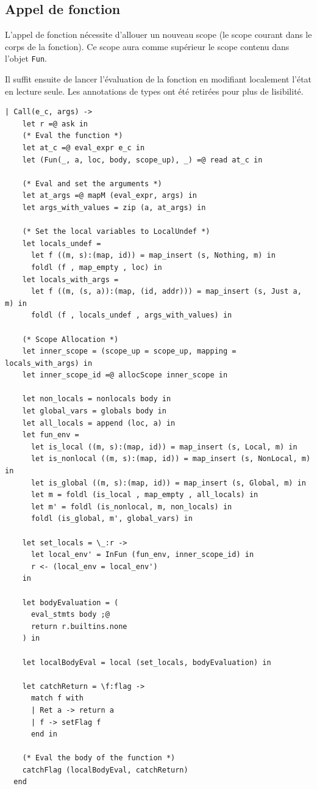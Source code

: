 \documentclass[a4paper, french, 11pt]{article}
\theoremstyle{break}
\begin{document}
\subsection{Appel de fonction}
L'appel de fonction nécessite d'allouer un nouveau scope (le scope courant dans le corps de la fonction).
Ce scope aura comme \og supérieur\fg{} le scope contenu dans l'objet \texttt{Fun}.

Il suffit ensuite de lancer l'évaluation de la fonction en modifiant localement l'état en lecture seule. Les annotations de types ont été retirées pour plus de lisibilité.

\begin{lstlisting}[style=myStyle, language=caml]
  | Call(e_c, args) ->
    let r =@ ask in
    (* Eval the function *)
    let at_c =@ eval_expr e_c in
    let (Fun(_, a, loc, body, scope_up), _) =@ read at_c in

    (* Eval and set the arguments *)
    let at_args =@ mapM (eval_expr, args) in
    let args_with_values = zip (a, at_args) in

    (* Set the local variables to LocalUndef *)
    let locals_undef =
      let f ((m, s):(map, id)) = map_insert (s, Nothing, m) in
      foldl (f , map_empty , loc) in
    let locals_with_args =
      let f ((m, (s, a)):(map, (id, addr))) = map_insert (s, Just a, m) in
      foldl (f , locals_undef , args_with_values) in

    (* Scope Allocation *)
    let inner_scope = (scope_up = scope_up, mapping = locals_with_args) in
    let inner_scope_id =@ allocScope inner_scope in

    let non_locals = nonlocals body in
    let global_vars = globals body in
    let all_locals = append (loc, a) in
    let fun_env =
      let is_local ((m, s):(map, id)) = map_insert (s, Local, m) in
      let is_nonlocal ((m, s):(map, id)) = map_insert (s, NonLocal, m) in
      let is_global ((m, s):(map, id)) = map_insert (s, Global, m) in
      let m = foldl (is_local , map_empty , all_locals) in
      let m' = foldl (is_nonlocal, m, non_locals) in
      foldl (is_global, m', global_vars) in

    let set_locals = \_:r ->
      let local_env' = InFun (fun_env, inner_scope_id) in
      r <- (local_env = local_env')
    in

    let bodyEvaluation = (
      eval_stmts body ;@
      return r.builtins.none
    ) in

    let localBodyEval = local (set_locals, bodyEvaluation) in

    let catchReturn = \f:flag ->
      match f with
      | Ret a -> return a
      | f -> setFlag f
      end in

    (* Eval the body of the function *)
    catchFlag (localBodyEval, catchReturn)
  end
\end{lstlisting}
\end{document}
